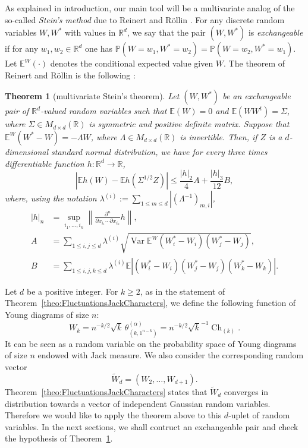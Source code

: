 \documentclass[11pt]{amsart}
\theoremstyle{plain}
\newtheorem{theorem}[lemma]{Theorem}
\theoremstyle{remark}
\newcommand{\RR}{\mathbb{R}}
\newcommand{\PP}{\mathbb{P}}
\newcommand{\esper}{\mathbb{E}}
\DeclareMathOperator{\Var}{Var}
\DeclareMathOperator{\Ch}{Ch}
\begin{document}
As explained in introduction, our main tool will be a multivariate analog
of the so-called {\em Stein's method}
due to Reinert and R{\"o}llin \cite{ReinertRollin2009}.
For any discrete random variables $W, W^*$ with values in $\RR^d$, we say that the pair $(W,W^*)$ is \emph{exchangeable} if for any $w_1,w_2 \in \RR^d$ one has $\PP(W = w_1, W^* = w_2) = \PP(W = w_2, W^* = w_1)$. Let $\esper^W(\cdot)$ denotes the conditional expected value given $W$.
The theorem of Reinert and R{\"o}llin is the following \cite[Theorem 2.1]{ReinertRollin2009}:
\begin{theorem}[multivariate Stein's theorem]
\label{theo:MultivariateStein}
Let $(W,W^*)$ be an exchangeable pair of $\RR^d$-valued random variables such that $\esper(W) = 0$ and $\esper(WW^t) = \varSigma$, where $\Sigma \in M_{d \times d}(\RR)$ is symmetric and positive definite matrix. Suppose that $\esper^W(W^* - W) = - \Lambda W$, where $\Lambda \in M_{d \times d}(\RR)$ is invertible. Then, if $Z$ is a $d$-dimensional standard normal distribution, we have for every three times differentiable function $h:\RR^d \to \RR$,
\begin{equation}
\left| \esper h(W) - \esper h(\varSigma^{1/2}Z) \right| \leq \frac{|h|_2}{4}A + \frac{|h|_3}{12}B,
\end{equation}
where, using the notation $\lambda^{(i)} := \sum_{1 \leq m \leq d}|(\Lambda^{-1})_{m,i}|$,
\begin{align*}
    |h|_n &= \sup_{i_1,\dots,i_n} \left\lVert \frac{\partial^n}{\partial x_{i_1} \cdots \partial x_{i_n}}h\right\rVert, \\
 A &= \sum_{1 \leq i,j \leq d} \lambda^{(i)} \sqrt{\Var \esper^W(W_i^* - W_i)(W_j^* - W_j)}, \\
 B &= \sum_{1 \leq i,j,k \leq d} \lambda^{(i)} \esper |(W_i^* - W_i)(W_j^* - W_j)(W_k^* - W_k)|.
\end{align*}
\end{theorem}

Let $d$ be a positive integer.
For $k \ge 2$, as in the statement of Theorem~\ref{theo:FluctuationsJackCharacters}, we define
the following function of Young diagrams of size $n$:
\[ W_k = n^{-k/2} \sqrt{k} \, \theta^{(\alpha)}_{(k,1^{n-k})} = n^{-k/2} \sqrt{k}^{-1} \Ch_{(k)}.\]
It can be seen as a random variable on the probability space
of Young diagrams of size $n$ endowed with Jack measure.
We also consider the corresponding random vector
\[ \tilde{W}_d = (W_2,\dots,W_{d+1}).\]
Theorem~\ref{theo:FluctuationsJackCharacters} states that $\tilde{W}_d$
converges in distribution towards a vector of independent Gaussian random variables.
Therefore we would like to apply the theorem above to this $d$-uplet of random variables.
In the next sections, we shall contruct an exchangeable pair and check the hypothesis
of Theorem~\ref{theo:MultivariateStein}.
\end{document}
